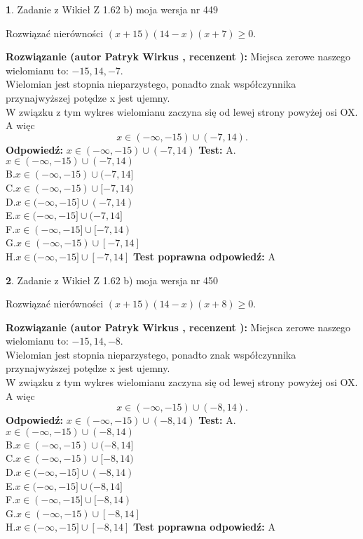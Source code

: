 \documentclass[12pt, a4paper]{article}
\theoremstyle{definition} %
\newtheorem{zad}{}
\newcommand{\zadStart}[1]{\begin{zad}#1\newline}
\newcommand{\zadStop}{\end{zad}}
\newcommand{\rozwStart}[2]{\noindent \textbf{Rozwiązanie (autor #1 , recenzent #2): }\newline}
\newcommand{\rozwStop}{\newline}
\newcommand{\odpStart}{\noindent \textbf{Odpowiedź:}\newline}
\newcommand{\odpStop}{\newline}
\newcommand{\testStart}{\noindent \textbf{Test:}\newline}
\newcommand{\testStop}{\newline}
\newcommand{\kluczStart}{\noindent \textbf{Test poprawna odpowiedź:}\newline}
\newcommand{\kluczStop}{\newline}
\begin{document}
\zadStart{Zadanie z Wikieł Z 1.62 b) moja wersja nr 449}

Rozwiązać nierówności $(x+15)(14-x)(x+7)\ge0$.
\zadStop
\rozwStart{Patryk Wirkus}{}
Miejsca zerowe naszego wielomianu to: $-15, 14, -7$.\\
Wielomian jest stopnia nieparzystego, ponadto znak współczynnika przy\linebreak najwyższej potędze x jest ujemny.\\ W związku z tym wykres wielomianu zaczyna się od lewej strony powyżej osi OX. A więc $$x \in (-\infty,-15) \cup (-7,14).$$
\rozwStop
\odpStart
$x \in (-\infty,-15) \cup (-7,14)$
\odpStop
\testStart
A.$x \in (-\infty,-15) \cup (-7,14)$\\
B.$x \in (-\infty,-15) \cup (-7,14]$\\
C.$x \in (-\infty,-15) \cup [-7,14)$\\
D.$x \in (-\infty,-15] \cup (-7,14)$\\
E.$x \in (-\infty,-15] \cup (-7,14]$\\
F.$x \in (-\infty,-15] \cup [-7,14)$\\
G.$x \in (-\infty,-15) \cup [-7,14]$\\
H.$x \in (-\infty,-15] \cup [-7,14]$
\testStop
\kluczStart
A
\kluczStop



\zadStart{Zadanie z Wikieł Z 1.62 b) moja wersja nr 450}

Rozwiązać nierówności $(x+15)(14-x)(x+8)\ge0$.
\zadStop
\rozwStart{Patryk Wirkus}{}
Miejsca zerowe naszego wielomianu to: $-15, 14, -8$.\\
Wielomian jest stopnia nieparzystego, ponadto znak współczynnika przy\linebreak najwyższej potędze x jest ujemny.\\ W związku z tym wykres wielomianu zaczyna się od lewej strony powyżej osi OX. A więc $$x \in (-\infty,-15) \cup (-8,14).$$
\rozwStop
\odpStart
$x \in (-\infty,-15) \cup (-8,14)$
\odpStop
\testStart
A.$x \in (-\infty,-15) \cup (-8,14)$\\
B.$x \in (-\infty,-15) \cup (-8,14]$\\
C.$x \in (-\infty,-15) \cup [-8,14)$\\
D.$x \in (-\infty,-15] \cup (-8,14)$\\
E.$x \in (-\infty,-15] \cup (-8,14]$\\
F.$x \in (-\infty,-15] \cup [-8,14)$\\
G.$x \in (-\infty,-15) \cup [-8,14]$\\
H.$x \in (-\infty,-15] \cup [-8,14]$
\testStop
\kluczStart
A
\kluczStop
\end{document}
